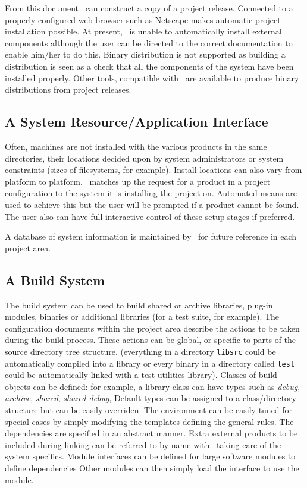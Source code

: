 \ni From this document \scram\ can construct a copy of a project release.
Connected to a properly configured web browser such as Netscape makes
automatic project installation possible. At present, \scram\ is unable
to automatically install external components although the user can be
directed to the correct documentation to enable him/her to do this.
Binary distribution is not supported as building a distribution is
seen as a check that all the components of the system have been
installed properly. Other tools, compatible with \scram\, are available
to produce binary distributions from project releases.

\subsection{A System Resource/Application Interface}\label{sec:resource}
Often, machines are not installed with the various products in the
same directories, their locations decided upon by system
administrators or system constraints (sizes of filesystems, for
example).  Install locations can also vary from platform to platform.
\scram\ matches up the request for a product in a project configuration
to the system it is installing the project on.  Automated means are
used to achieve this but the user will be prompted if a product cannot
be found. The user also can have full interactive control of these
setup stages if preferred.

\ni A database of system information is maintained by \scram\ for
future reference in each project area.

\subsection{A Build System}\label{sec:bs}
The build system can be used to build shared or archive libraries, 
plug-in modules, binaries or additional libraries (for a test suite,
for example).  The configuration documents within the project area
describe the actions to be taken during the build process. These
actions can be global, or specific to parts of the source directory
tree structure.  (\eg everything in a directory \texttt{libsrc} could
be automatically compiled into a library or every binary in a
directory called \texttt{test} could be automatically linked with a
test utilities library).
\ni Classes of build objects can be defined: for example, a library class
can have types such as {\em debug}, {\em archive}, {\em shared}, {\em
  shared debug}, \etc Default types can be assigned to a
class/directory structure but can be easily overriden.%
The environment can be easily tuned for
special cases by simply modifying the templates defining the general
rules.  The dependencies are specified in an abstract manner. Extra 
external products to be included during linking can be referred to 
by name with \scram\ taking care of the system specifics.
\ni Module interfaces can be defined for large software modules to define
dependencies \etc Other modules can then simply load the interface to
use the module.

